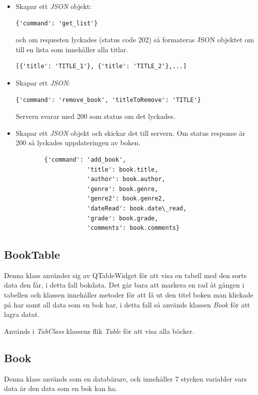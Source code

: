 \documentclass[11pt, titlepage, oneside, a4paper]{article}
\newcommand{\Subsection}[1]{\vspace{-4pt}\subsection{#1}\vspace{-8pt}}
\begin{document}
\begin{itemize}
        \item[get\_all\_titles:] Skapar ett \emph{JSON} objekt: \begin{verbatim}{'command': 'get_list'}\end{verbatim} och om requesten lyckades (status code 202) så formateras JSON objektet om till en lista som innehåller alla titlar.
        
         \begin{verbatim}[{'title': 'TITLE_1'}, {'title': 'TITLE_2'},...]\end{verbatim}
        
        \item[remove\_title:] Skapar ett \emph{JSON}: \begin{verbatim}{'command': 'remove_book', 'titleToRemove': 'TITLE'}\end{verbatim} Servern svarar med 200 som status om det lyckades.
		
        \item[submit\_changes:] Skapar ett \emph{JSON} objekt och skickar det till servern. Om status response är 200 så lyckades uppdateringen av boken.
        
        \begin{verbatim}
        {'command': 'add_book',
        	        'title': book.title,
                    'author': book.author,
                    'genre': book.genre,
                    'genre2': book.genre2,
                    'dateRead': book.date\_read,
                    'grade': book.grade,
                    'comments': book.comments}
        \end{verbatim}
        
        \end{itemize}
        
        \subsection{BookTable}
        Denna klass använder sig av QTableWidget för att visa en tabell med den sorts data den får, i detta fall bokdata.
        Det går bara att markera en rad åt gången i tabellen och klassen innehåller metoder för att 
        få ut den titel boken man klickade på har samt all data som en bok har, i detta fall så används klassen \emph{Book} för att lagra datat.
        
        Används i \emph{TabClass} klassens  flik \emph{Table} för att visa alla böcker.
        \Subsection{Book}
        Denna klass används som en databärare, och innehåller 7 stycken variabler vars data är den data som en bok kan ha.
        
\end{document}
